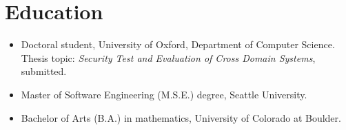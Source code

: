 \section*{Education}
\vspace{-2mm}

\begin{itemize}
	\item Doctoral student, University of Oxford, Department of
		Computer Science. Thesis topic: \emph{Security Test and
		Evaluation of Cross Domain Systems}, submitted.\vspace{-1mm}
	\item Master of Software Engineering (M.S.E.) degree, Seattle University.\vspace{-1mm}
	\item Bachelor of Arts (B.A.) in mathematics, University of Colorado at Boulder.
\end{itemize}

